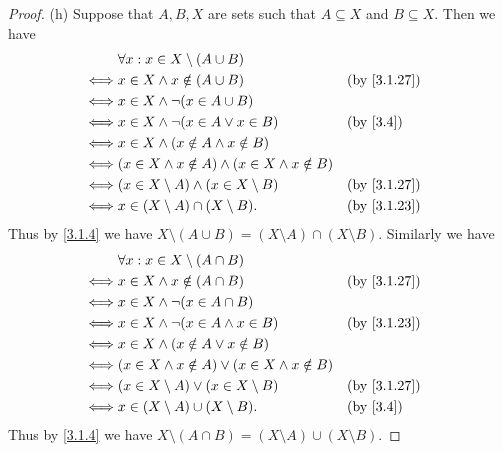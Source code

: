 \begin{proof}{(h)}
  Suppose that \(A, B, X\) are sets such that \(A \subseteq X\) and \(B \subseteq X\).
  Then we have
  \begin{align*}
         & \forall x : x \in X \setminus (A \cup B)                                                   \\
    \iff & x \in X \land x \notin (A \cup B)                           &  & \text{(by \cref{3.1.27})} \\
    \iff & x \in X \land \lnot (x \in A \cup B)                                                       \\
    \iff & x \in X \land \lnot (x \in A \lor x \in B)                  &  & \text{(by \cref{3.4})}    \\
    \iff & x \in X \land (x \notin A \land x \notin B)                                                \\
    \iff & (x \in X \land x \notin A) \land (x \in X \land x \notin B)                                \\
    \iff & (x \in X \setminus A) \land (x \in X \setminus B)           &  & \text{(by \cref{3.1.27})} \\
    \iff & x \in (X \setminus A) \cap (X \setminus B).                 &  & \text{(by \cref{3.1.23})}
  \end{align*}
  Thus by \cref{3.1.4} we have \(X \setminus (A \cup B) = (X \setminus A) \cap (X \setminus B)\).
  Similarly we have
  \begin{align*}
         & \forall x : x \in X \setminus (A \cap B)                                                  \\
    \iff & x \in X \land x \notin (A \cap B)                          &  & \text{(by \cref{3.1.27})} \\
    \iff & x \in X \land \lnot (x \in A \cap B)                                                      \\
    \iff & x \in X \land \lnot (x \in A \land x \in B)                &  & \text{(by \cref{3.1.23})} \\
    \iff & x \in X \land (x \notin A \lor x \notin B)                                                \\
    \iff & (x \in X \land x \notin A) \lor (x \in X \land x \notin B)                                \\
    \iff & (x \in X \setminus A) \lor (x \in X \setminus B)           &  & \text{(by \cref{3.1.27})} \\
    \iff & x \in (X \setminus A) \cup (X \setminus B).                &  & \text{(by \cref{3.4})}
  \end{align*}
  Thus by \cref{3.1.4} we have \(X \setminus (A \cap B) = (X \setminus A) \cup (X \setminus B)\).
\end{proof}


